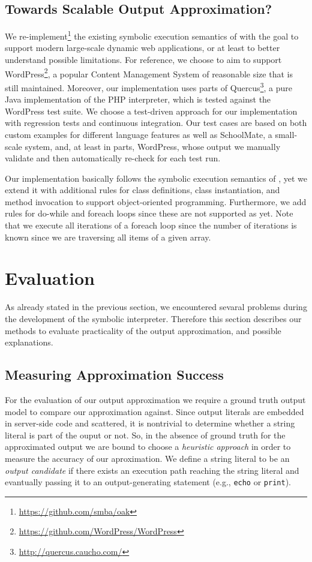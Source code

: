 \documentclass[preprint]{sig-alternate-05-2015}
\begin{document}
\subsection{Towards Scalable Output Approximation?}
We re-implement\footnote{\url{https://github.com/smba/oak}} the existing symbolic execution semantics of \cite{Nguyen:2014:BCG:2635868.2635928} with the goal to support modern large-scale dynamic web applications, or at least to better understand possible limitations. For reference, we choose to aim to support  \textsf{WordPress}\footnote{\url{https://github.com/WordPress/WordPress}}, a popular Content Management System of reasonable size that is still maintained. Moreover, our implementation uses parts of Quercus\footnote{\url{http://quercus.caucho.com/}}, a pure Java implementation of the PHP interpreter, which is tested against the \textsf{WordPress} test suite. We choose a test-driven approach for our implementation with regression tests and continuous integration. Our test cases are based on both custom examples for different language features as well as \textsf{SchoolMate}, a small-scale system, and, at least in parts, \textsf{WordPress}, whose output we manually validate and then automatically re-check for each test run.

Our implementation basically follows the symbolic execution semantics of \cite{Nguyen:2014:BCG:2635868.2635928}, yet we extend it with additional rules for class definitions, class instantiation, and method invocation to support object-oriented programming. Furthermore, we add rules for do-while and  foreach loops since these are not supported as yet. Note that we execute all iterations of a foreach loop since the number of iterations is known since we are traversing all items of a given array.

\section{Evaluation}
As already stated in the previous section, we encountered sevaral problems
during the development of the symbolic interpreter. Therefore this section
describes our methods to evaluate practicality of the output approximation, and
possible explanations.

\subsection{Measuring Approximation Success} \label{heuristic}
For the evaluation of our output approximation we require a ground truth output model to compare our approximation against. Since output literals are embedded in server-side code and scattered, it is nontrivial to determine whether a string literal is part of the ouput or not. So, in the absence of ground truth for the approximated output we are bound to choose a \emph{heuristic approach} in order to measure the accuracy of our aproximation. We define a string literal to be an \emph{output candidate} if there exists an execution path reaching the string literal and evantually passing it to an 
output-generating statement (e.g., \texttt{echo} or \texttt{print}).
\end{document}
